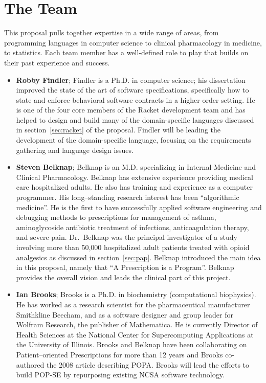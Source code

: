 
\section{The Team}

This proposal pulls together expertise in a wide range of areas, from
programming languages in computer science to clinical pharmacology in
medicine, to statistics. Each team member has a well-defined role to
play that builds on their past experience and success.

\begin{itemize}
\item\textbf{Robby Findler}; Findler is a Ph.D. in computer science;
  his dissertation improved the state of the art of software
  specifications, specifically how to state and enforce behavioral
  software contracts in a higher-order setting. He is one of the
  four core members of the Racket development team and has helped to
  design and build many of the domain-specific languages discussed in
  section~\ref{sec:racket} of the proposal. Findler will be leading
  the development of the domain-specific language, focusing on the
  requirements gathering and language design issues.

  \item\textbf{Steven Belknap}; Belknap is an M.D. specializing in
    Internal Medicine and Clinical Pharmacology. Belknap has extensive
    experience providing medical care hospitalized adults.  He also
    has training and experience as a computer programmer. His
    long–standing research interest has been ``algorithmic medicine''.
    He is the first to have successfully applied software engineering
    and debugging methods to prescriptions for management of asthma,
    aminoglycoside antibiotic treatment of infections, anticoagulation
    therapy, and severe pain. Dr.\ Belknap was the principal
    investigator of a study involving more than 50,000 hospitalized
    adult patients treated with opioid analgesics as discussed in
    section~\ref{sec:pap}. Belknap introduced the main idea in this
    proposal, namely that ``A Prescription is a Program''. Belknap
    provides the overall vision and leads the clinical part of this
    project.

\item\textbf{Ian Brooks}; Brooks is a Ph.D. in biochemistry
  (computational biophysics). He has worked as a research scientist
  for the pharmaceutical manufacturer Smithkline Beecham, and as a
  software designer and group leader for Wolfram Research, the
  publisher of Mathematica. He is currently Director of Health
  Sciences at the National Center for Supercomputing Applications at
  the University of Illinois. Brooks and Belknap have been
  collaborating on Patient–oriented Prescriptions for more than 12
  years and Brooks co-authored the 2008 article describing
  POPA. Brooks will lead the efforts to build POP-SE by repurposing
  existing NCSA software technology.


\end{itemize}
